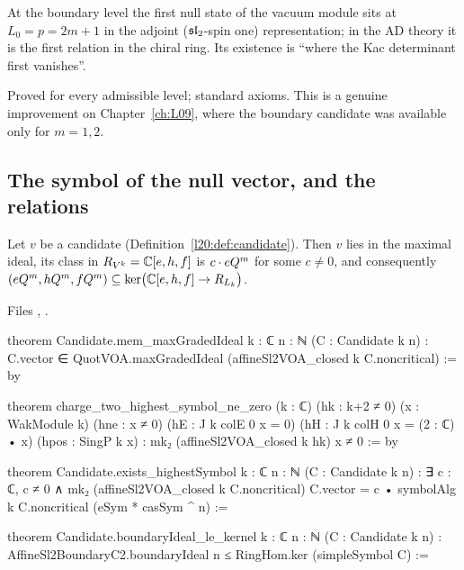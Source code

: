 \begin{physics}
At the boundary level the first null state of the vacuum module sits at $L_0=p=2m+1$ in the adjoint
($\mathfrak{sl}_2$-spin one) representation; in the AD theory it is the first relation in the chiral ring. Its
existence is ``where the Kac determinant first vanishes''.
\end{physics}

\begin{status}
Proved for every admissible level; standard axioms. This is a genuine improvement on Chapter~\ref{ch:L09},
where the boundary candidate was available only for $m=1,2$.
\end{status}

\subsection{The symbol of the null vector, and the relations}

\begin{theorem}\label{l20:thm:symbol}
Let $v$ be a candidate (Definition~\ref{l20:def:candidate}). Then $v$ lies in the maximal ideal, its class in
$R_{V^k}={\mathbb{C}}[e,h,f]$ is $c\cdot eQ^m$ for some $c\neq0$, and consequently
$(eQ^m,hQ^m,fQ^m)\subseteq\ker\bigl({\mathbb{C}}[e,h,f]\to R_{L_k}\bigr)$.
\end{theorem}
\noindent Files ,
.
\begin{leancode}
theorem Candidate.mem_maxGradedIdeal {k : ℂ} {n : ℕ} (C : Candidate k n) :
    C.vector ∈ QuotVOA.maxGradedIdeal (affineSl2VOA_closed k C.noncritical) := by

theorem charge_two_highest_symbol_ne_zero (k : ℂ) (hk : k+2 ≠ 0)
    (x : WakModule k) (hne : x ≠ 0)
    (hE : J k colE 0 x = 0) (hH : J k colH 0 x = (2 : ℂ) • x)
    (hpos : SingP k x) :
    mk₂ (affineSl2VOA_closed k hk) x ≠ 0 := by

theorem Candidate.exists_highestSymbol {k : ℂ} {n : ℕ} (C : Candidate k n) :
    ∃ c : ℂ, c ≠ 0 ∧ mk₂ (affineSl2VOA_closed k C.noncritical) C.vector =
      c • symbolAlg k C.noncritical
        (eSym * casSym ^ n) :=

theorem Candidate.boundaryIdeal_le_kernel {k : ℂ} {n : ℕ} (C : Candidate k n) :
    AffineSl2BoundaryC2.boundaryIdeal n ≤
      RingHom.ker (simpleSymbol C) :=
\end{leancode}

